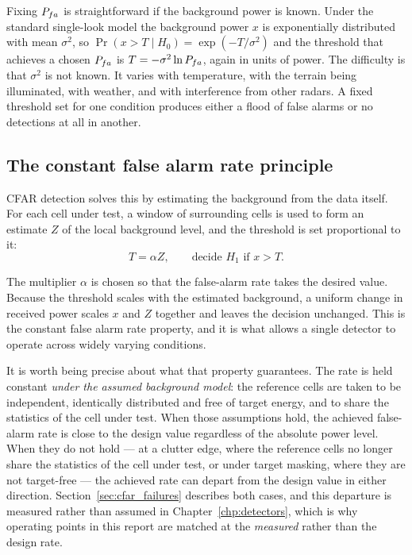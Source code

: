 Fixing $P_{fa}$ is straightforward if the background power is known. Under the standard single-look
model the background power $x$ is exponentially distributed with mean $\sigma^2$, so
$\Pr(x > T \mid H_0) = \exp(-T/\sigma^2)$ and the threshold that achieves a chosen $P_{fa}$ is
$T = -\sigma^2 \ln P_{fa}$, again in units of power. The
difficulty is that $\sigma^2$ is not known. It varies with temperature, with the terrain being
illuminated, with weather, and with interference from other radars. A fixed threshold set for one
condition produces either a flood of false alarms or no detections at all in another.

\subsection{The constant false alarm rate principle}

CFAR detection solves this by estimating the background from the data itself. For each cell under
test, a window of surrounding cells is used to form an estimate $Z$ of the local background level,
and the threshold is set proportional to it:
\begin{equation}
T = \alpha Z,
\qquad
\text{decide } H_1 \text{ if } x > T.
\label{eq:cfar}
\end{equation}

The multiplier $\alpha$ is chosen so that the false-alarm rate takes the desired value. Because the
threshold scales with the estimated background, a uniform change in received power scales $x$ and
$Z$ together and leaves the decision unchanged. This is the constant false alarm rate property, and
it is what allows a single detector to operate across widely varying conditions.

It is worth being precise about what that property guarantees. The rate is held constant
\emph{under the assumed background model}: the reference cells are taken to be independent,
identically distributed and free of target energy, and to share the statistics of the cell under
test. When those assumptions hold, the achieved false-alarm rate is close to the design value
regardless of the absolute power level. When they do not hold --- at a clutter edge, where the
reference cells no longer share the statistics of the cell under test, or under target masking,
where they are not target-free --- the achieved rate can depart from the design value in either
direction. Section~\ref{sec:cfar_failures} describes both cases, and this departure is measured
rather than assumed in Chapter~\ref{chp:detectors}, which is why operating points in this report
are matched at the \emph{measured} rather than the design rate.

